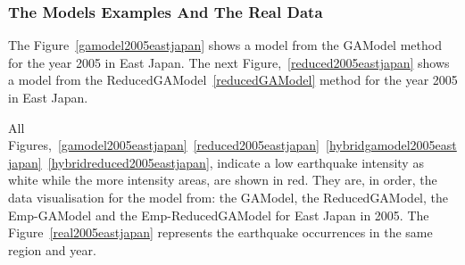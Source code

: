 \subsubsection{The Models Examples And The Real Data}

The Figure~\ref{gamodel2005eastjapan} shows a model from the GAModel method for the year 2005 in East Japan. The next Figure,~\ref{reduced2005eastjapan} shows a model from the ReducedGAModel~\ref{reducedGAModel} method for the year 2005 in East Japan.

All Figures,~\ref{gamodel2005eastjapan}~\ref{reduced2005eastjapan}~\ref{hybridgamodel2005eastjapan}~\ref{hybridreduced2005eastjapan},  indicate a low earthquake intensity as white while the more intensity areas, are shown in red. They are, in order, the data visualisation for the model from: the GAModel, the ReducedGAModel, the Emp-GAModel and the Emp-ReducedGAModel for East Japan in 2005. The Figure~\ref{real2005eastjapan} represents the earthquake occurrences in the same region and year.


%
%
%




